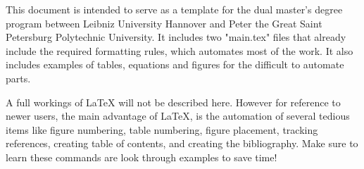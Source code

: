 \label{chap:introduction}
This document is intended to serve as a template for the dual master's degree program between Leibniz University Hannover and Peter the Great Saint Petersburg Polytechnic University. It includes two "main.tex" files that already include the required formatting rules, which automates most of the work. It also includes examples of tables, equations and figures for the difficult to automate parts.

A full workings of LaTeX will not be described here. However for reference to newer users, the main advantage of LaTeX, is the automation of several tedious items like figure numbering, table numbering, figure placement, tracking references, creating table of contents, and creating the bibliography. Make sure to learn these commands are look through examples to save time!